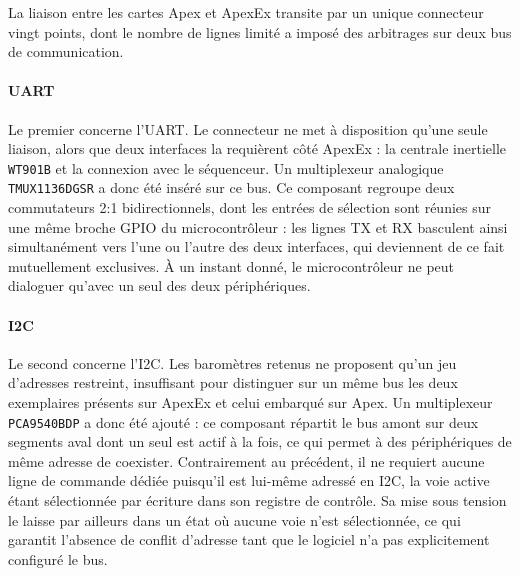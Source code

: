 La liaison entre les cartes Apex et ApexEx transite par un unique connecteur vingt points, dont le nombre de lignes limité a
imposé des arbitrages sur deux bus de communication.

\paragraph*{UART}
Le premier concerne l'\acrshort{UART}. Le connecteur ne met à disposition qu'une seule liaison, alors que deux interfaces la
requièrent côté ApexEx : la centrale inertielle \verb|WT901B| et la connexion avec le séquenceur. Un multiplexeur analogique
\verb|TMUX1136DGSR| a donc été inséré sur ce bus. Ce composant regroupe deux commutateurs 2:1 bidirectionnels, dont les entrées de
sélection sont réunies sur une même broche \acrshort{GPIO} du microcontrôleur : les lignes TX et RX basculent ainsi simultanément
vers l'une ou l'autre des deux interfaces, qui deviennent de ce fait mutuellement exclusives. À un instant donné, le
microcontrôleur ne peut dialoguer qu'avec un seul des deux périphériques.

\paragraph*{I2C}
Le second concerne l'\acrshort{I2C}. Les baromètres retenus ne proposent qu'un jeu d'adresses restreint, insuffisant pour distinguer
sur un même bus les deux exemplaires présents sur ApexEx et celui embarqué sur Apex. Un multiplexeur \verb|PCA9540BDP| a donc été
ajouté : ce composant répartit le bus amont sur deux segments aval dont un seul est actif à la fois, ce qui permet à des
périphériques de même adresse de coexister. Contrairement au précédent, il ne requiert aucune ligne de commande dédiée puisqu'il
est lui-même adressé en \acrshort{I2C}, la voie active étant sélectionnée par écriture dans son registre de contrôle. Sa mise sous
tension le laisse par ailleurs dans un état où aucune voie n'est sélectionnée, ce qui garantit l'absence de conflit d'adresse tant
que le logiciel n'a pas explicitement configuré le bus.

\newpage
